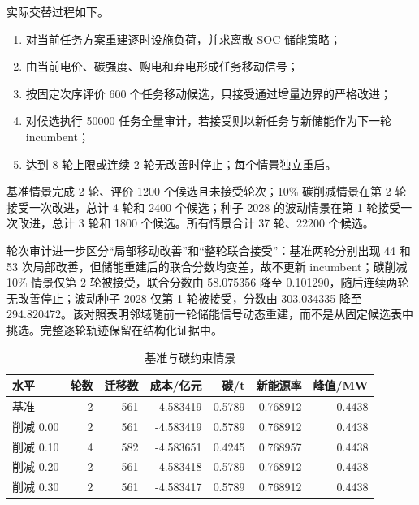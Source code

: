 实际交替过程如下。
\begin{enumerate}
\item 对当前任务方案重建逐时设施负荷，并求离散 SOC 储能策略；
\item 由当前电价、碳强度、购电和弃电形成任务移动信号；
\item 按固定次序评价 600 个任务移动候选，只接受通过增量边界的严格改进；
\item 对候选执行 50000 任务全量审计，若接受则以新任务与新储能作为下一轮 incumbent；
\item 达到 8 轮上限或连续 2 轮无改善时停止；每个情景独立重启。
\end{enumerate}

基准情景完成 2 轮、评价 1200 个候选且未接受轮次；10\% 碳削减情景在第 2 轮接受一次改进，总计 4 轮和 2400 个候选；种子 2028 的波动情景在第 1 轮接受一次改进，总计 3 轮和 1800 个候选。所有情景合计 37 轮、22200 个候选。


轮次审计进一步区分“局部移动改善”和“整轮联合接受”：基准两轮分别出现 44 和 53 次局部改善，但储能重建后的联合分数均变差，故不更新 incumbent；碳削减 10\% 情景仅第 2 轮被接受，联合分数由 58.075356 降至 0.101290，随后连续两轮无改善停止；波动种子 2028 仅第 1 轮被接受，分数由 303.034335 降至 294.820472。该对照表明邻域随前一轮储能信号动态重建，而不是从固定候选表中挑选。完整逐轮轨迹保留在结构化证据中。

\begin{table}[H]\centering
{\small
\caption{基准与碳约束情景}\label{tab:q4scenarios}
\begin{tabular}{lrrrrrr}\toprule
水平 & 轮数 & 迁移数 & 成本/亿元 & 碳/t & 新能源率 & 峰值/MW\\\midrule
基准 & 2 & 561 & -4.583419 & 0.5789 & 0.768912 & 0.4438\\
削减 0.00 & 2 & 561 & -4.583419 & 0.5789 & 0.768912 & 0.4438\\
削减 0.10 & 4 & 582 & -4.583651 & 0.4245 & 0.768957 & 0.4438\\
削减 0.20 & 2 & 561 & -4.583418 & 0.5789 & 0.768912 & 0.4438\\
削减 0.30 & 2 & 561 & -4.583417 & 0.5789 & 0.768912 & 0.4438\\\bottomrule
\end{tabular}
}
\end{table}

